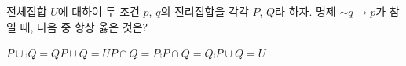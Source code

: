 전체집합 $U$에 대하여 두 조건 $p$, $q$의 진리집합을 각각 $P$, $Q$라 하자. 명제 $\sim q\longrightarrow p$가 참일 때, 다음 중 항상 옳은 것은?
\begin{choices32}{$P\cup\comp{Q}=Q$}{$P\cup Q=U$}{$P\cap Q=P$}{$\comp{P}\cap Q=Q$}{$\comp{P}\cup Q=U$}\end{choices32}
